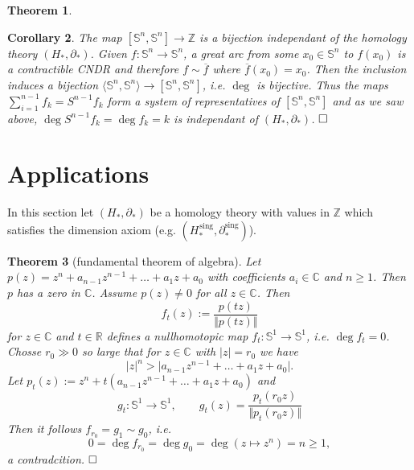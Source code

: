 \documentclass[11pt]{book}
\numberwithin{dummy}{section}
\newtheorem{theorem}{Theorem}[section]
\newtheorem{corollary}[theorem]{Corollary}
\theoremstyle{nonumberbreak}
\newenvironment{pr}[1][]{\ifthenelse{\equal{#1}{}}{\proof}{\proof[#1]}\rm}{\endproof}
\newcommand{\Sph}{\mathbb{S}}
\newcommand{\la}{\longrightarrow}
\newcommand{\Z}{\mathbb{Z}}
\newcommand{\Hs}{H^{\hspace{1pt}\mathrm{sing}}}
\begin{document}
\begin{spacing}{1.4}
\begin{theorem}
\end{theorem}


\begin{corollary}
The map $[\Sph^n, \Sph^n] \la \Z$ is a bijection independant of the homology theory $(H_*, \partial_*)$.
\begin{pr}
Given $f: \Sph^n \la \Sph^n$, a great arc from some $x_0 \in \Sph^n$ to $f(x_0)$ is a contractible CNDR and therefore $f \sim \overline{f}$ where $\overline{f}(x_0) = x_0$. Then the inclusion induces a bijection $\langle\Sph^n, \Sph^n\rangle \la [\Sph^n, \Sph^n]$, i.e. $\deg$ is bijective. Thus the maps $\sum_{i=1}^{n-1} f_k  = S^{n-1} f_k$ form a system of representatives of $[\Sph^n, \Sph^n]$ and as we saw above, $\deg S^{n-1}f_k = \deg f_k = k$ is independant of $(H_*, \partial_*)$. $\hfill \Box$

\end{pr}

\end{corollary}





























\section{Applications} %




In this section let $(H_*, \partial_*)$ be a homology theory with values in $\Z$ which satisfies the dimension axiom (e.g. $(\Hs_*, \partial^{\mathrm{sing}}_*)$).

\begin{theorem}[fundamental theorem of algebra]
Let $p(z) = z^n + a_{n-1}z^{n-1} + \ldots + a_1z + a_0$ with coefficients $a_i \in \mathbb{C}$ and $n \geqslant 1$. Then $p$ has a zero in $\mathbb{C}$. 
\begin{pr}
Assume $p(z)\neq 0$ for all $z \in \mathbb{C}$. Then 
$$f_t(z) := \frac{ p(tz)}{\Vert p(tz)\Vert}$$
for $z \in \mathbb{C}$ and $t \in \mathbb{R}$ defines a nullhomotopic map $f_t: \Sph^1 \la \Sph^1$, i.e. $\deg f_t = 0$. Chosse $r_0 \gg 0$ so large that for $ z \in \mathbb{C}$ with $\vert z \vert = r_0$ we have
$$\vert z \vert^n > \vert a_{n-1} z^{n-1} + \ldots + a_1 z + a_0 \vert.$$
Let $p_t(z) := z^n + t (a_{n-1}z^{n-1} + \ldots + a_1z + a_0)$ and 
$$g_t: \Sph^1 \la \Sph^1, \qquad g_t(z) = \frac{p_t(r_0z)}{\Vert p_t(r_0 z)\Vert}$$
Then it follows $f_{r_0} =g_1 \sim g_0$, i.e. 
$$0 = \deg f_{r_0} = \deg g_0 = \deg (z \mapsto z^n) = n \geqslant 1,$$
a contradcition. $\hfill \Box$


\end{pr}
\end{theorem}
\end{spacing}
\end{document}
